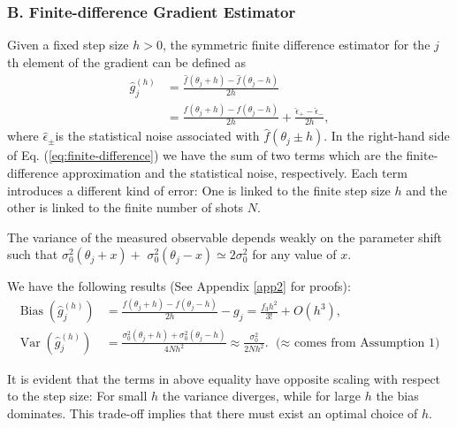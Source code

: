 \subsubsection{B. Finite-difference Gradient Estimator}

Given a fixed step size $h>0$, the symmetric finite difference estimator for the $j$ th element of the gradient can be defined as
\begin{equation}\label{eq:finite-difference}
    \begin{aligned}
\hat{g}_j^{(h)} & =\frac{\hat{f}\left(\theta_j+h\right)-\hat{f}\left(\theta_j-h\right)}{2 h} \\
& =\frac{f\left(\theta_j+h\right)-f\left(\theta_j-h\right)}{2 h}+\frac{\hat{\epsilon}_{+}-\hat{\epsilon}_{-}}{2 h},
\end{aligned}
\end{equation}
where $\hat{\epsilon}_{ \pm}$is the statistical noise associated with $\hat{f}\left(\theta_j \pm h\right)$. In the right-hand side of Eq. (\ref{eq:finite-difference}) we have the sum of two terms which are the finite-difference approximation and the statistical noise, respectively. Each term introduces a different kind of error: One is linked to the finite step size $h$ and the other is linked to the finite number of shots $N$.

\begin{definition}[Assumption 1]
     The variance of the measured observable depends weakly on the parameter shift such that $\sigma_0^2\left(\theta_j+x\right)+$ $\sigma_0^2\left(\theta_j-x\right) \simeq 2 \sigma_0^2$ for any value of $x$.
\end{definition}

\begin{theorem}
    We have the following results (See Appendix \ref{app2} for proofs): 
\begin{align}
\operatorname{Bias}\left(\hat{g}_j^{(h)}\right) & =\frac{f\left(\theta_j+h\right)-f\left(\theta_j-h\right)}{2 h}-g_j 
=\frac{f_3 h^2}{3!}+O\left(h^3\right), \\
\operatorname{Var}\left(\hat{g}_j^{(h)}\right) & =\frac{\sigma_0^2\left(\theta_j+h\right)+\sigma_0^2\left(\theta_j-h\right)}{4 N h^2} \approx \frac{\sigma_0^2}{2 N h^2}. \text{ ($\approx$ comes from Assumption 1)}
\end{align}
\end{theorem}
It is evident that the terms in above equality have opposite scaling with respect to the step size: For small $h$ the variance diverges, while for large $h$ the bias dominates. This trade-off implies that there must exist an optimal choice of $h$.

